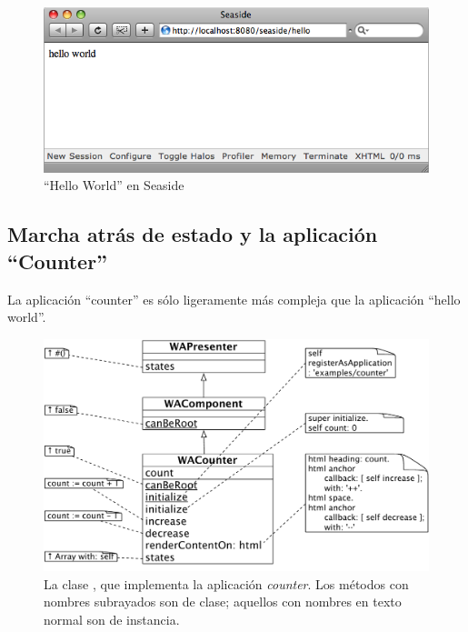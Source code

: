 \documentclass[a4paper,10pt,twoside]{book}
\begin{document}
\begin{figure}[htb]
\begin{center}
\includegraphics[width=\textwidth]{WAHelloWorld}
\caption{``Hello World'' en Seaside}
\end{center}
\end{figure}

\subsection{Marcha atrás de estado y la aplicación ``Counter''}

La aplicación ``counter'' es sólo ligeramente más compleja que la aplicación ``hello world''.

\begin{figure}[ht]
\begin{center}
\includegraphics[width=\textwidth]{WACounter}
\caption{La clase , que implementa la aplicación \emph{counter}. Los métodos con nombres subrayados son de clase; aquellos con nombres en texto normal son de instancia.}
\end{center}
\end{figure}
\end{document}
